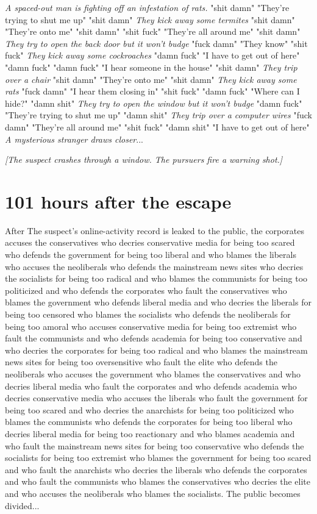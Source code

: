 \documentclass{report}
\begin{document}
\textit{A spaced-out man is fighting off an infestation of rats.} "shit damn" "They're trying to shut me up" "shit damn" \textit{They kick away some termites} "shit damn" "They're onto me" "shit damn" \textit{} "shit fuck" "They're all around me" "shit damn" \textit{They try to open the back door but it won't budge} "fuck damn" "They know" "shit fuck" \textit{They kick away some cockroaches} "damn fuck" "I have to get out of here" "damn fuck" \textit{} "damn fuck" "I hear someone in the house" "shit damn" \textit{They trip over a chair} "shit damn" "They're onto me" "shit damn" \textit{They kick away some rats} "fuck damn" "I hear them closing in" "shit fuck" \textit{} "damn fuck" "Where can I hide?" "damn shit" \textit{They try to open the window but it won't budge} "damn fuck" "They're trying to shut me up" "damn shit" \textit{They trip over a computer wires} "fuck damn" "They're all around me" "shit fuck" \textit{} "damn shit" "I have to get out of here" \textit{A mysterious stranger draws closer}...

\textit{[The suspect crashes through a window. The pursuers fire a warning shot.]}


\section*{101 \small{hours after the escape}}

After The suspect's online-activity record is leaked to the public, the corporates accuses the conservatives who decries conservative media for being too scared who defends the government for being too liberal and who blames the liberals who accuses the neoliberals who defends the mainstream news sites who decries the socialists for being too radical and who blames the communists for being too politicized and who defends the corporates who fault the conservatives who blames the government who defends liberal media and who decries the liberals for being too censored who blames the socialists who defends the neoliberals for being too amoral who accuses conservative media for being too extremist who fault the communists and who defends academia for being too conservative and who decries the corporates for being too radical and who blames the mainstream news sites for being too oversensitive who fault the elite who defends the neoliberals who accuses the government who blames the conservatives and who decries liberal media who fault the corporates and who defends academia who decries conservative media who accuses the liberals who fault the government for being too scared and who decries the anarchists for being too politicized who blames the communists who defends the corporates for being too liberal who decries liberal media for being too reactionary and who blames academia and who fault the mainstream news sites for being too conservative who defends the socialists for being too extremist who blames the government for being too scared and who fault the anarchists who decries the liberals who defends the corporates and who fault the communists who blames the conservatives who decries the elite and who accuses the neoliberals who blames the socialists. The public becomes divided...
\end{document}
